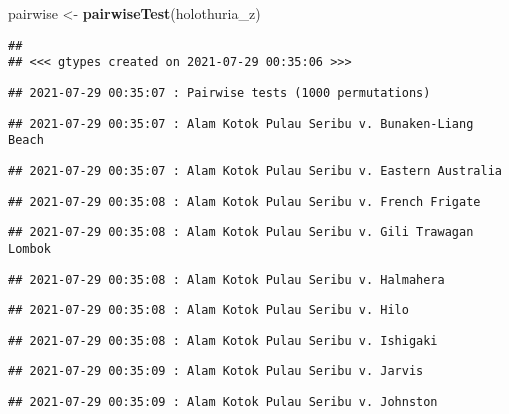 \documentclass[
]{article}
\newenvironment{Shaded}{\begin{snugshade}}{\end{snugshade}}
\newcommand{\KeywordTok}[1]{\textcolor[rgb]{0.13,0.29,0.53}{\textbf{#1}}}
\newcommand{\NormalTok}[1]{#1}
\newcommand{\StringTok}[1]{\textcolor[rgb]{0.31,0.60,0.02}{#1}}
\begin{document}
\begin{Shaded}
\begin{Highlighting}[]
\NormalTok{pairwise <-}\StringTok{ }\KeywordTok{pairwiseTest}\NormalTok{(holothuria_z)}
\end{Highlighting}
\end{Shaded}

\begin{verbatim}
## 
## <<< gtypes created on 2021-07-29 00:35:06 >>>
\end{verbatim}

\begin{verbatim}
## 2021-07-29 00:35:07 : Pairwise tests (1000 permutations)
\end{verbatim}

\begin{verbatim}
## 2021-07-29 00:35:07 : Alam Kotok Pulau Seribu v. Bunaken-Liang Beach
\end{verbatim}

\begin{verbatim}
## 2021-07-29 00:35:07 : Alam Kotok Pulau Seribu v. Eastern Australia
\end{verbatim}

\begin{verbatim}
## 2021-07-29 00:35:08 : Alam Kotok Pulau Seribu v. French Frigate
\end{verbatim}

\begin{verbatim}
## 2021-07-29 00:35:08 : Alam Kotok Pulau Seribu v. Gili Trawagan Lombok
\end{verbatim}

\begin{verbatim}
## 2021-07-29 00:35:08 : Alam Kotok Pulau Seribu v. Halmahera
\end{verbatim}

\begin{verbatim}
## 2021-07-29 00:35:08 : Alam Kotok Pulau Seribu v. Hilo
\end{verbatim}

\begin{verbatim}
## 2021-07-29 00:35:08 : Alam Kotok Pulau Seribu v. Ishigaki
\end{verbatim}

\begin{verbatim}
## 2021-07-29 00:35:09 : Alam Kotok Pulau Seribu v. Jarvis
\end{verbatim}

\begin{verbatim}
## 2021-07-29 00:35:09 : Alam Kotok Pulau Seribu v. Johnston
\end{verbatim}
\end{document}

